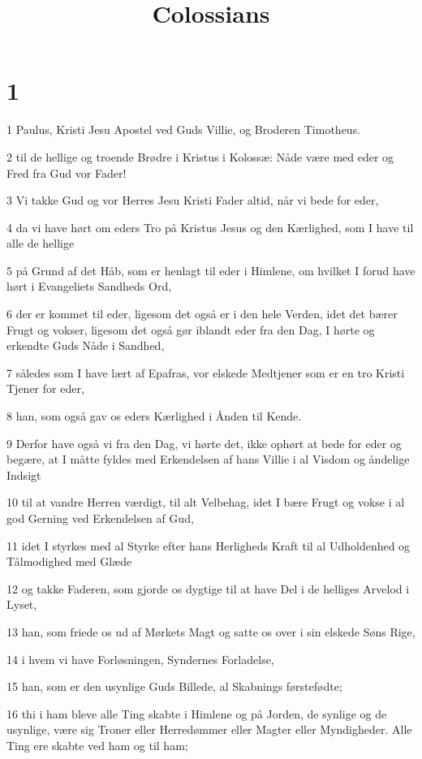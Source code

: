 

\title{Colossians}


\chapter{1}

\par 1 Paulus, Kristi Jesu Apostel ved Guds Villie, og Broderen Timotheus.
\par 2 til de hellige og troende Brødre i Kristus i Kolossæ: Nåde være med eder og Fred fra Gud vor Fader!
\par 3 Vi takke Gud og vor Herres Jesu Kristi Fader altid, når vi bede for eder,
\par 4 da vi have hørt om eders Tro på Kristus Jesus og den Kærlighed, som I have til alle de hellige
\par 5 på Grund af det Håb, som er henlagt til eder i Himlene, om hvilket I forud have hørt i Evangeliets Sandheds Ord,
\par 6 der er kommet til eder, ligesom det også er i den hele Verden, idet det bærer Frugt og vokser, ligesom det også gør iblandt eder fra den Dag, I hørte og erkendte Guds Nåde i Sandhed,
\par 7 således som I have lært af Epafras, vor elskede Medtjener som er en tro Kristi Tjener for eder,
\par 8 han, som også gav os eders Kærlighed i Ånden til Kende.
\par 9 Derfor have også vi fra den Dag, vi hørte det, ikke ophørt at bede for eder og begære, at I måtte fyldes med Erkendelsen af hans Villie i al Visdom og åndelige Indsigt
\par 10 til at vandre Herren værdigt, til alt Velbehag, idet I bære Frugt og vokse i al god Gerning ved Erkendelsen af Gud,
\par 11 idet I styrkes med al Styrke efter hans Herligheds Kraft til al Udholdenhed og Tålmodighed med Glæde
\par 12 og takke Faderen, som gjorde os dygtige til at have Del i de helliges Arvelod i Lyset,
\par 13 han, som friede os ud af Mørkets Magt og satte os over i sin elskede Søns Rige,
\par 14 i hvem vi have Forløsningen, Syndernes Forladelse,
\par 15 han, som er den usynlige Guds Billede, al Skabnings førstefødte;
\par 16 thi i ham bleve alle Ting skabte i Himlene og på Jorden, de synlige og de usynlige, være sig Troner eller Herredømmer eller Magter eller Myndigheder. Alle Ting ere skabte ved ham og til ham;
